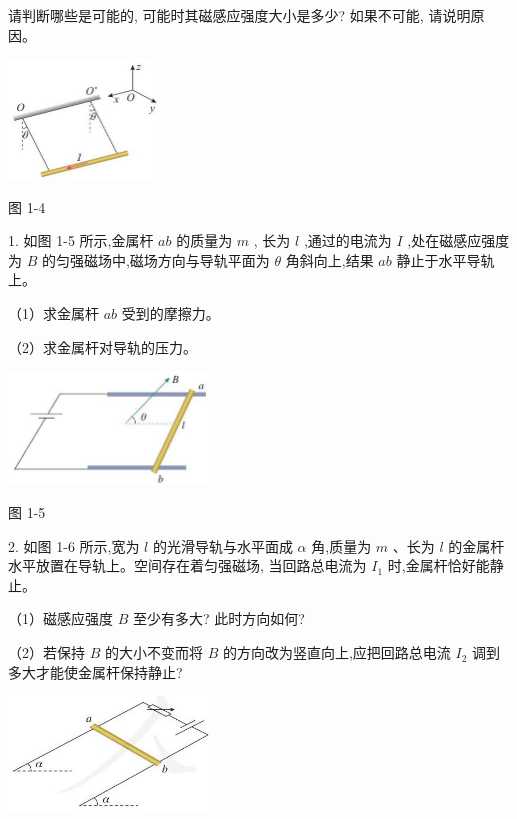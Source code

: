 \documentclass[10pt]{article}
\begin{document}
请判断哪些是可能的, 可能时其磁感应强度大小是多少? 如果不可能, 请说明原因。

\begin{center}
\includegraphics[max width=0.3\textwidth]{images/01910e72-c5b7-7ed5-a6d4-fb3a5faefc32_26_939137.jpg}
\end{center}

图 1-4

1. 如图 1-5 所示,金属杆 \({ab}\) 的质量为 \(m\) , 长为 \(l\) ,通过的电流为 \(I\) ,处在磁感应强度为 \(B\) 的匀强磁场中,磁场方向与导轨平面为 \(\theta\) 角斜向上,结果 \({ab}\) 静止于水平导轨上。

（1）求金属杆 \({ab}\) 受到的摩擦力。

（2）求金属杆对导轨的压力。

\begin{center}
\includegraphics[max width=0.4\textwidth]{images/01910e72-c5b7-7ed5-a6d4-fb3a5faefc32_27_480802.jpg}
\end{center}

图 1-5

2. 如图 1-6 所示,宽为 \(l\) 的光滑导轨与水平面成 \(\alpha\) 角,质量为 \(m\) 、长为 \(l\) 的金属杆水平放置在导轨上。空间存在着匀强磁场, 当回路总电流为 \({I}_{1}\) 时,金属杆恰好能静止。

（1）磁感应强度 \(B\) 至少有多大? 此时方向如何?

（2）若保持 \(B\) 的大小不变而将 \(B\) 的方向改为竖直向上,应把回路总电流 \({I}_{2}\) 调到多大才能使金属杆保持静止?

\begin{center}
\includegraphics[max width=0.4\textwidth]{images/01910e72-c5b7-7ed5-a6d4-fb3a5faefc32_27_374731.jpg}
\end{center}
\end{document}
